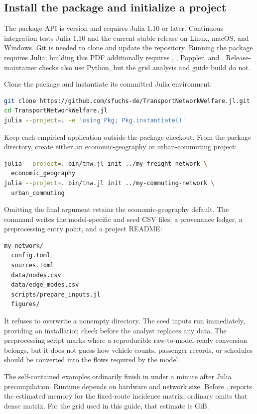 \subsection{Install the package and initialize a project}

The package API is version \PackageVersion{} and requires Julia 1.10 or later. Continuous
integration tests Julia 1.10 and the current stable release on Linux, macOS,
and Windows. Git is needed to clone and update the repository. Running the
package requires Julia; building this PDF additionally requires
, , Poppler, and . Release-maintainer
checks also use Python, but the grid analysis and guide build do not.

Clone the package and instantiate its committed Julia environment:
\begin{lstlisting}[language=bash]
git clone https://github.com/sfuchs-de/TransportNetworkWelfare.jl.git
cd TransportNetworkWelfare.jl
julia --project=. -e 'using Pkg; Pkg.instantiate()'
\end{lstlisting}
Keep each empirical application outside the package checkout. From the package
directory, create either an economic-geography or urban-commuting project:
\begin{lstlisting}[language=bash]
julia --project=. bin/tnw.jl init ../my-freight-network \
  economic_geography
julia --project=. bin/tnw.jl init ../my-commuting-network \
  urban_commuting
\end{lstlisting}
Omitting the final argument retains the economic-geography default. The command
writes the model-specific  and seed CSV files, a
\code{sources.toml} provenance ledger, a preprocessing entry point, and a
project README:
\begin{lstlisting}
my-network/
  config.toml
  sources.toml
  data/nodes.csv
  data/edge_modes.csv
  scripts/prepare_inputs.jl
  figures/
\end{lstlisting}
It refuses to overwrite a nonempty directory. The seed inputs run immediately,
providing an installation check before the analyst replaces any data. The
preprocessing script marks where a reproducible raw-to-model-ready conversion
belongs, but it does not guess how vehicle counts, passenger records, or
schedules should be converted into the flows required by the model.

The self-contained examples ordinarily finish in under a minute after Julia
precompilation. Runtime depends on hardware and network size. Before
\code{decompose}, \code{validate} reports the estimated memory for the
fixed-route incidence matrix; ordinary \code{analyze} omits that dense matrix.
For the grid used in this guide, that estimate is
\GridDecompositionIncidenceGiB{} GiB.

